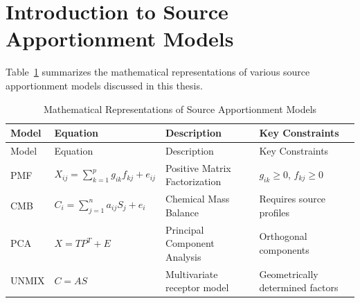 \documentclass[
  letterpaper,
  oneside,
  openany]{MastersDoctoralThesis}
\begin{document}
\section{Introduction to Source Apportionment
Models}\label{sec-ch1-intro-models}

Table~\ref{tbl-intro-equations} summarizes the mathematical
representations of various source apportionment models discussed in this
thesis.

\begin{longtable}[]{@{}
  >{\raggedright\arraybackslash}p{}
  >{\raggedright\arraybackslash}p{}
  >{\raggedright\arraybackslash}p{}
  >{\raggedright\arraybackslash}p{}@{}}
\caption{Mathematical Representations of Source Apportionment
Models}\label{tbl-intro-equations}\tabularnewline
\toprule\noalign{}
\begin{minipage}[b]{\linewidth}\raggedright
Model
\end{minipage} & \begin{minipage}[b]{\linewidth}\raggedright
Equation
\end{minipage} & \begin{minipage}[b]{\linewidth}\raggedright
Description
\end{minipage} & \begin{minipage}[b]{\linewidth}\raggedright
Key Constraints
\end{minipage} \\
\midrule\noalign{}
\endfirsthead
\toprule\noalign{}
\begin{minipage}[b]{\linewidth}\raggedright
Model
\end{minipage} & \begin{minipage}[b]{\linewidth}\raggedright
Equation
\end{minipage} & \begin{minipage}[b]{\linewidth}\raggedright
Description
\end{minipage} & \begin{minipage}[b]{\linewidth}\raggedright
Key Constraints
\end{minipage} \\
\midrule\noalign{}
\endhead
\bottomrule\noalign{}
\endlastfoot
PMF & \(X_{ij} = \sum_{k=1}^{p} g_{ik}f_{kj} + e_{ij}\) & Positive
Matrix Factorization & \(g_{ik} \geq 0\), \(f_{kj} \geq 0\) \\
CMB & \(C_i = \sum_{j=1}^{n} a_{ij} S_{j} + e_i\) & Chemical Mass
Balance & Requires source profiles \\
PCA & \(X = TP^T + E\) & Principal Component Analysis & Orthogonal
components \\
UNMIX & \(C = AS\) & Multivariate receptor model & Geometrically
determined factors \\
\end{longtable}
\end{document}
